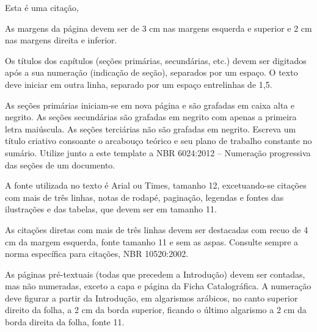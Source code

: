 \begin{table}[htb]
\end{table}

\begin{citacao}
    Esta é uma citação, \lipsum[20]
\end{citacao}

As margens da página devem ser de 3 cm nas margens esquerda e superior e 2 cm nas margens direita e inferior.

Os títulos dos capítulos (seções primárias, secundárias, etc.) devem ser digitados após a sua numeração (indicação de seção), separados por um espaço. O texto deve iniciar em outra linha, separado por um espaço entrelinhas de 1,5.


As seções primárias iniciam-se em nova página e são grafadas em caixa alta e negrito. As seções secundárias são grafadas em negrito com apenas a primeira letra maiúscula. As seções terciárias não são grafadas em negrito. Escreva um título criativo consoante o arcabouço teórico e seu plano de trabalho constante no sumário. Utilize junto a este template a NBR 6024:2012 – Numeração progressiva das seções de um documento.

A fonte utilizada no texto é Arial ou Times, tamanho 12, excetuando-se citações com mais de três linhas, notas de rodapé, paginação, legendas e fontes das ilustrações e das tabelas, que devem ser em tamanho 11. 

As citações diretas com mais de três linhas devem ser destacadas com recuo de 4 cm da margem esquerda, fonte tamanho 11 e sem as aspas. Consulte sempre a norma específica para citações, NBR 10520:2002.

As páginas pré-textuais (todas que precedem a Introdução) devem ser contadas, mas não numeradas, exceto a capa e página da Ficha Catalográfica. A numeração deve figurar a partir da Introdução, em algarismos arábicos, no canto superior direito da folha, a 2 cm da borda superior, ficando o último algarismo a 2 cm da borda direita da folha, fonte 11.
